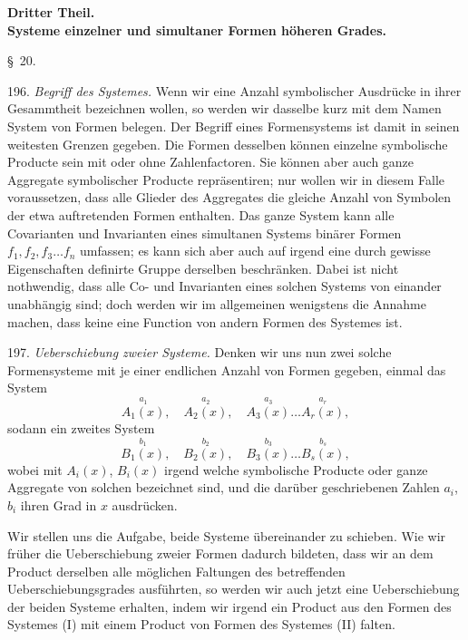 \documentclass[11pt]{article}
\providecommand{\gesperrt}[1]{\textls[130]{#1}}
\providecommand{\weberpage}[1]{}
\providecommand{\weq}[2]{\begin{equation}\tag{#1}#2\end{equation}}
\begin{document}
\begin{center}
\textbf{Dritter Theil.}\\[4pt]
\textbf{Systeme einzelner und simultaner Formen h\"oheren Grades.}
\end{center}

\begin{center}
\S~20.\\
\gesperrt{Ueberschiebung von Systemen.}
\end{center}

196. \textit{Begriff des Systemes.} Wenn wir eine Anzahl symbolischer Ausdr\"ucke in ihrer Gesammtheit bezeichnen wollen, so werden wir dasselbe kurz mit dem Namen \glqq System von Formen\grqq{} belegen. Der Begriff eines Formensystems ist damit in seinen weitesten Grenzen gegeben. Die Formen desselben k\"onnen einzelne symbolische Producte sein mit oder ohne Zahlenfactoren. Sie k\"onnen aber auch ganze Aggregate symbolischer Producte repr\"asentiren; nur wollen wir in diesem Falle voraussetzen, dass alle Glieder des Aggregates die gleiche Anzahl von Symbolen der etwa auftretenden Formen enthalten. Das ganze System kann alle Covarianten und Invarianten eines simultanen Systems bin\"arer Formen $f_1, f_2, f_3 \ldots f_n$ umfassen; es kann sich aber auch auf irgend eine durch gewisse Eigenschaften definirte Gruppe derselben beschr\"anken. Dabei ist nicht nothwendig, dass alle Co- und Invarianten eines solchen Systems von einander unabh\"angig sind; doch werden wir im allgemeinen wenigstens die Annahme machen, dass keine eine \gesperrt{ganze} Function von andern Formen des Systemes ist.

197. \textit{Ueberschiebung zweier Systeme.} Denken wir uns nun zwei solche Formensysteme mit je einer endlichen Anzahl von Formen gegeben, einmal das System
\weq{I}{\overset{a_1}{A_1(x)}, \quad \overset{a_2}{A_2(x)}, \quad \overset{a_3}{A_3(x)} \ldots \overset{a_r}{A_r(x)},}
sodann ein zweites System
\weq{II}{\overset{b_1}{B_1(x)}, \quad \overset{b_2}{B_2(x)}, \quad \overset{b_3}{B_3(x)} \ldots \overset{b_s}{B_s(x)},}
wobei mit $A_i(x)$, $B_i(x)$ irgend welche symbolische Producte oder ganze Aggregate von solchen bezeichnet sind, und die dar\"uber geschriebenen Zahlen $a_i$, $b_i$ ihren Grad in $x$ ausdr\"ucken.


\weberpage{222}
Wir stellen uns die Aufgabe, beide Systeme \"ubereinander zu schieben. Wie wir fr\"uher die Ueberschiebung zweier Formen dadurch bildeten, dass wir an dem Product derselben alle m\"oglichen Faltungen des betreffenden Ueberschiebungsgrades ausf\"uhrten, so werden wir auch jetzt eine Ueberschiebung der beiden Systeme erhalten, indem wir irgend ein Product aus den Formen des Systemes (I) mit einem Product von Formen des Systemes (II) falten.
\end{document}
